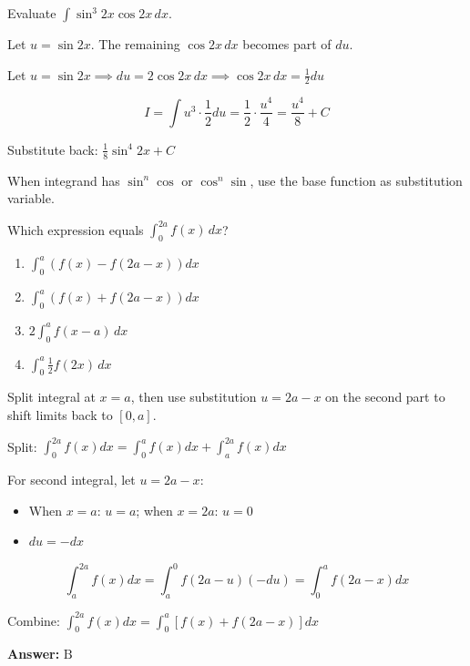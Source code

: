\begin{problem}
Evaluate $\displaystyle \int \sin^3 2x \cos 2x \, dx$.
\end{problem}

\begin{hint}
Let $u = \sin 2x$. The remaining $\cos 2x \, dx$ becomes part of $du$.
\end{hint}

\begin{solution}
Let $u = \sin 2x \implies du = 2\cos 2x \, dx \implies \cos 2x \, dx = \frac{1}{2}du$

\[
I = \int u^3 \cdot \frac{1}{2} du = \frac{1}{2} \cdot \frac{u^4}{4} = \frac{u^4}{8} + C
\]

Substitute back: $\boxed{\frac{1}{8}\sin^4 2x + C}$
\end{solution}

\begin{takeaways}
When integrand has $\sin^n \cos$ or $\cos^n \sin$, use the base function as substitution variable.
\end{takeaways}

\vspace{1cm}

\begin{problem}
Which expression equals $\displaystyle \int_0^{2a} f(x) \, dx$?

\begin{enumerate}[label=\Alph*.]
\item $\displaystyle \int_0^a \left( f(x) - f(2a - x) \right) dx$
\item $\displaystyle \int_0^a \left( f(x) + f(2a - x) \right) dx$
\item $\displaystyle 2 \int_0^a f(x - a) \, dx$
\item $\displaystyle \int_0^a \frac{1}{2} f(2x) \, dx$
\end{enumerate}
\end{problem}

\begin{hint}
Split integral at $x=a$, then use substitution $u = 2a - x$ on the second part to shift limits back to $[0,a]$.
\end{hint}

\begin{solution}
Split: $\displaystyle \int_0^{2a} f(x)dx = \int_0^a f(x)dx + \int_a^{2a} f(x)dx$

For second integral, let $u = 2a - x$:
\begin{itemize}
\item When $x=a$: $u=a$; when $x=2a$: $u=0$
\item $du = -dx$
\end{itemize}

\[
\int_a^{2a} f(x)dx = \int_a^0 f(2a-u)(-du) = \int_0^a f(2a-x)dx
\]

Combine: $\displaystyle \int_0^{2a} f(x)dx = \int_0^a [f(x) + f(2a-x)]dx$

\textbf{Answer:} $\boxed{\text{B}}$
\end{solution}

